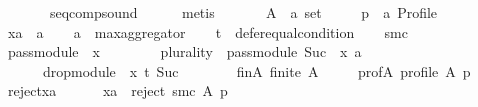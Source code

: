 \begin{isabellebody}
\ \ \ \ \ \ \ \ \ \ seq{\isacharunderscore}{\kern0pt}comp{\isacharunderscore}{\kern0pt}sound\isanewline
\ \ \ \ \isamarkupfalse%
\ metis\isanewline
{}\isamarkupfalse%
\isanewline
\ \ \isamarkupfalse%
\isanewline
\ \ \ \ A\ {\isacharcolon}{\kern0pt}{\isacharcolon}{\kern0pt}\ {\isachardoublequoteopen}{\isacharprime}{\kern0pt}a\ set{\isachardoublequoteclose}\ \isanewline
\ \ \ \ p\ {\isacharcolon}{\kern0pt}{\isacharcolon}{\kern0pt}\ {\isachardoublequoteopen}{\isacharprime}{\kern0pt}a\ Profile{\isachardoublequoteclose}\ \isanewline
\ \ \ \ xa\ {\isacharcolon}{\kern0pt}{\isacharcolon}{\kern0pt}\ {\isachardoublequoteopen}{\isacharprime}{\kern0pt}a{\isachardoublequoteclose}\isanewline
\ \ \isamarkupfalse%
\ {\isacharquery}{\kern0pt}a\ {\isacharequal}{\kern0pt}\ {\isachardoublequoteopen}max{\isacharunderscore}{\kern0pt}aggregator{\isachardoublequoteclose}\isanewline
\ \ \isamarkupfalse%
\ {\isacharquery}{\kern0pt}t\ {\isacharequal}{\kern0pt}\ {\isachardoublequoteopen}defer{\isacharunderscore}{\kern0pt}equal{\isacharunderscore}{\kern0pt}condition{\isachardoublequoteclose}\isanewline
\ \ \isamarkupfalse%
\ {\isacharquery}{\kern0pt}smc\ {\isacharequal}{\kern0pt}\isanewline
\ \ \ \ {\isachardoublequoteopen}pass{\isacharunderscore}{\kern0pt}module\ {}\ x\ {\isasymtriangleright}\isanewline
\ \ \ \ \ \ \ {\isacharparenleft}{\kern0pt}{\isacharparenleft}{\kern0pt}plurality{\isasymdown}{\isacharparenright}{\kern0pt}\ {\isasymtriangleright}\ pass{\isacharunderscore}{\kern0pt}module\ {\isacharparenleft}{\kern0pt}Suc\ {}{\isacharparenright}{\kern0pt}\ x{\isacharparenright}{\kern0pt}\ {\isasymparallel}\isactrlsub {\isacharquery}{\kern0pt}a\isanewline
\ \ \ \ \ \ \ \ \ drop{\isacharunderscore}{\kern0pt}module\ {}\ x\ {\isasymcirclearrowleft}\isactrlsub {\isacharquery}{\kern0pt}t\ {\isacharparenleft}{\kern0pt}Suc\ {}{\isacharparenright}{\kern0pt}{\isachardoublequoteclose}\isanewline
\ \ \isamarkupfalse%
\isanewline
\ \ \ \ fin{\isacharunderscore}{\kern0pt}A{\isacharcolon}{\kern0pt}\ {\isachardoublequoteopen}finite\ A{\isachardoublequoteclose}\ \isanewline
\ \ \ \ prof{\isacharunderscore}{\kern0pt}A{\isacharcolon}{\kern0pt}\ {\isachardoublequoteopen}profile\ A\ p{\isachardoublequoteclose}\ \isanewline
\ \ \ \ reject{\isacharunderscore}{\kern0pt}xa{\isacharcolon}{\kern0pt}\isanewline
\ \ \ \ \ \ {\isachardoublequoteopen}xa\ {\isasymin}\ reject\ {\isacharparenleft}{\kern0pt}{\isacharquery}{\kern0pt}smc{\isacharparenright}{\kern0pt}\ A\ p{\isachardoublequoteclose}\ \isanewline

\end{isabellebody}
